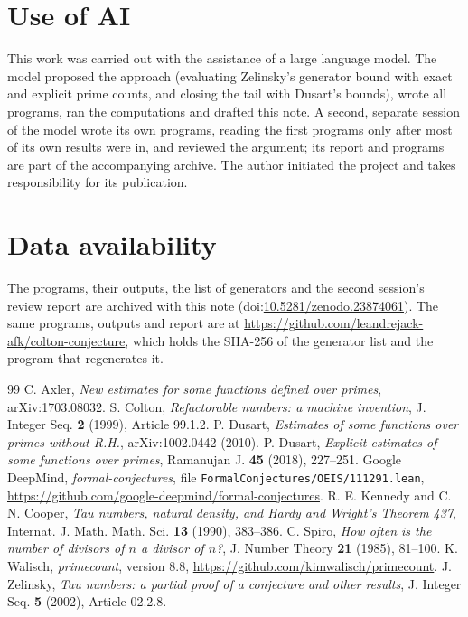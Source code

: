 \documentclass[11pt]{article}
\theoremstyle{remark}
\begin{document}
\section*{Use of AI}

This work was carried out with the assistance of a large language model. The model proposed the approach (evaluating Zelinsky's generator bound with exact and explicit prime counts, and closing the tail with Dusart's bounds), wrote all programs, ran the computations and drafted this note. A second, separate session of the model wrote its own programs, reading the first programs only after most of its own results were in, and reviewed the argument; its report and programs are part of the accompanying archive. The author initiated the project and takes responsibility for its publication.

\section*{Data availability}

The programs, their outputs, the list of generators and the second session's review report are archived with this note (doi:\href{https://doi.org/10.5281/zenodo.23874061}{10.5281/zenodo.23874061}). The same programs, outputs and report are at \url{https://github.com/leandrejack-afk/colton-conjecture}, which holds the SHA-256 of the generator list and the program that regenerates it.

\begin{thebibliography}{99}
 C. Axler, \emph{New estimates for some functions defined over primes}, arXiv:1703.08032.
 S. Colton, \emph{Refactorable numbers: a machine invention}, J. Integer Seq. \textbf{2} (1999), Article 99.1.2.
 P. Dusart, \emph{Estimates of some functions over primes without R.H.}, arXiv:1002.0442 (2010).
 P. Dusart, \emph{Explicit estimates of some functions over primes}, Ramanujan J. \textbf{45} (2018), 227--251.
 Google DeepMind, \emph{formal-conjectures}, file \texttt{FormalConjectures/OEIS/111291.lean}, \url{https://github.com/google-deepmind/formal-conjectures}.
 R. E. Kennedy and C. N. Cooper, \emph{Tau numbers, natural density, and Hardy and Wright's Theorem 437}, Internat. J. Math. Math. Sci. \textbf{13} (1990), 383--386.
 C. Spiro, \emph{How often is the number of divisors of $n$ a divisor of $n$?}, J. Number Theory \textbf{21} (1985), 81--100.
 K. Walisch, \emph{primecount}, version 8.8, \url{https://github.com/kimwalisch/primecount}.
 J. Zelinsky, \emph{Tau numbers: a partial proof of a conjecture and other results}, J. Integer Seq. \textbf{5} (2002), Article 02.2.8.
\end{thebibliography}
\end{document}
